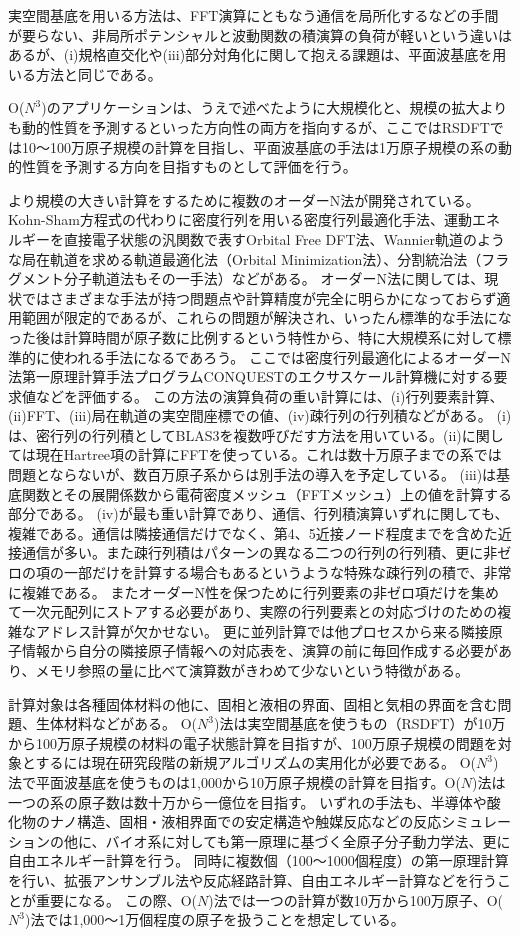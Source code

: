 実空間基底を用いる方法は、FFT演算にともなう通信を局所化するなどの手間が要らない、非局所ポテンシャルと波動関数の積演算の負荷が軽いという違いはあるが、(i)規格直交化や(iii)部分対角化に関して抱える課題は、平面波基底を用いる方法と同じである。

O($N^3$)のアプリケーションは、うえで述べたように大規模化と、規模の拡大よりも動的性質を予測するといった方向性の両方を指向するが、ここではRSDFTでは10～100万原子規模の計算を目指し、平面波基底の手法は1万原子規模の系の動的性質を予測する方向を目指すものとして評価を行う。

より規模の大きい計算をするために複数のオーダーN法が開発されている。Kohn-Sham方程式の代わりに密度行列を用いる密度行列最適化手法、運動エネルギーを直接電子状態の汎関数で表すOrbital Free DFT法、Wannier軌道のような局在軌道を求める軌道最適化法（Orbital Minimization法）、分割統治法（フラグメント分子軌道法もその一手法）などがある。
オーダーN法に関しては、現状ではさまざまな手法が持つ問題点や計算精度が完全に明らかになっておらず適用範囲が限定的であるが、これらの問題が解決され、いったん標準的な手法になった後は計算時間が原子数に比例するという特性から、特に大規模系に対して標準的に使われる手法になるであろう。
ここでは密度行列最適化によるオーダーN法第一原理計算手法プログラムCONQUESTのエクサスケール計算機に対する要求値などを評価する。
この方法の演算負荷の重い計算には、(i)行列要素計算、(ii)FFT、(iii)局在軌道の実空間座標での値、(iv)疎行列の行列積などがある。
(i)は、密行列の行列積としてBLAS3を複数呼びだす方法を用いている。(ii)に関しては現在Hartree項の計算にFFTを使っている。これは数十万原子までの系では問題とならないが、数百万原子系からは別手法の導入を予定している。
(iii)は基底関数とその展開係数から電荷密度メッシュ（FFTメッシュ）上の値を計算する部分である。
(iv)が最も重い計算であり、通信、行列積演算いずれに関しても、複雑である。通信は隣接通信だけでなく、第4、5近接ノード程度までを含めた近接通信が多い。また疎行列積はパターンの異なる二つの行列の行列積、更に非ゼロの項の一部だけを計算する場合もあるというような特殊な疎行列の積で、非常に複雑である。
またオーダーN性を保つために行列要素の非ゼロ項だけを集めて一次元配列にストアする必要があり、実際の行列要素との対応づけのための複雑なアドレス計算が欠かせない。
更に並列計算では他プロセスから来る隣接原子情報から自分の隣接原子情報への対応表を、演算の前に毎回作成する必要があり、メモリ参照の量に比べて演算数がきわめて少ないという特徴がある。


計算対象は各種固体材料の他に、固相と液相の界面、固相と気相の界面を含む問題、生体材料などがある。
O($N^3$)法は実空間基底を使うもの（RSDFT）が10万から100万原子規模の材料の電子状態計算を目指すが、100万原子規模の問題を対象とするには現在研究段階の新規アルゴリズムの実用化が必要である。
O($N^3$)法で平面波基底を使うものは1,000から10万原子規模の計算を目指す。O($N$)法は一つの系の原子数は数十万から一億位を目指す。
いずれの手法も、半導体や酸化物のナノ構造、固相・液相界面での安定構造や触媒反応などの反応シミュレーションの他に、バイオ系に対しても第一原理に基づく全原子分子動力学法、更に自由エネルギー計算を行う。
同時に複数個（100～1000個程度）の第一原理計算を行い、拡張アンサンブル法や反応経路計算、自由エネルギー計算などを行うことが重要になる。
この際、O($N$)法では一つの計算が数10万から100万原子、O($N^3$)法では1,000～1万個程度の原子を扱うことを想定している。

